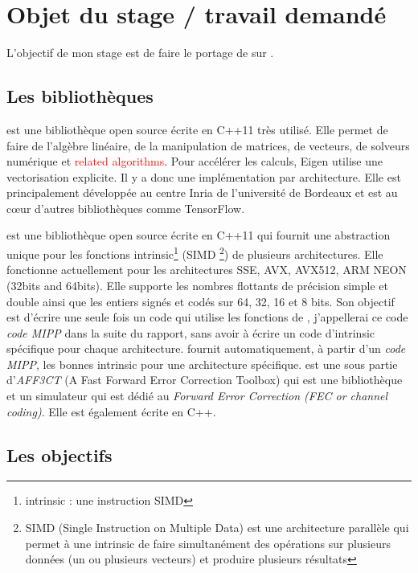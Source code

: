 \section{Objet du stage / travail demandé}

L'objectif de mon stage est de faire le portage de \Eigen sur \MIPP.

\subsection{Les bibliothèques}

\Eigen est une bibliothèque open source écrite en C++11 très utilisé. Elle permet
de faire de l'algèbre linéaire, de la manipulation de matrices, de vecteurs,
de solveurs numérique et \textcolor{red}{related algorithms}. Pour accélérer les calculs,
Eigen utilise une vectorisation explicite. Il y a donc une implémentation par
architecture. Elle est principalement développée au centre Inria de l'université de
Bordeaux et est au cœur d'autres bibliothèques comme TensorFlow.


\MIPP est une bibliothèque open source écrite en C++11 qui fournit une abstraction
unique pour les fonctions intrinsic\footnote{intrinsic : une instruction SIMD} (SIMD
\footnote{SIMD (Single Instruction on Multiple Data) est une architecture parallèle
qui permet à une intrinsic de faire simultanément des opérations sur plusieurs données
(un ou plusieurs vecteurs) et produire plusieurs résultats}) de plusieurs architectures.
Elle fonctionne actuellement pour les architectures SSE, AVX, AVX512, ARM NEON (32bits and
64bits). Elle supporte les nombres flottants de précision simple et double ainsi que les
entiers signés et codés sur 64, 32, 16 et 8 bits. Son objectif est d'écrire une seule fois un
code qui utilise les fonctions de \MIPP, j'appellerai ce code \emph{code MIPP} dans
la suite du rapport, sans avoir à écrire un code d'intrinsic spécifique pour chaque
architecture. \MIPP fournit automatiquement, à partir d'un \emph{code MIPP}, les
bonnes intrinsic pour une architecture spécifique. \MIPP est une sous partie
d'\emph{AFF3CT} (A Fast Forward Error Correction Toolbox) qui est une bibliothèque et un
simulateur qui est dédié au \emph{Forward Error Correction (FEC or channel coding)}. Elle
est également écrite en C++.

\subsection{Les objectifs}

